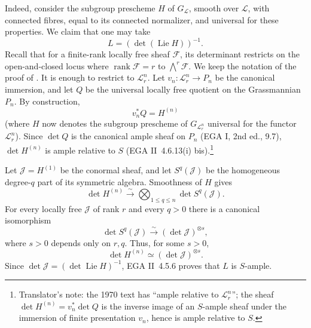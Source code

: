 
Indeed, consider the subgroup prescheme \(H\) of \(G_{\mathcal L}\),
smooth over \(\mathcal L\), with connected fibres, equal to its
connected normalizer, and universal for these properties. We claim
that one may take
\[
  L=(\det(\operatorname{Lie}H))^{-1}.
\]
Recall that for a finite-rank locally free sheaf \(\mathcal F\), its
determinant restricts on the open-and-closed locus where
\(\operatorname{rank}\mathcal F=r\) to \(\bigwedge^r\mathcal F\).
We keep the notation of the proof of .
It is enough to restrict to \(\mathcal L_r^n\). Let
\(v_n:\mathcal L_r^n\to P_n\) be the canonical immersion, and let
\(Q\) be the universal locally free quotient on the Grassmannian
\(P_n\). By construction,
\[
  v_n^*Q=H^{(n)}
\]
(where \(H\) now denotes the subgroup prescheme of \(G_{\mathcal L_r^n}\) universal for the
functor \(\mathcal L_r^n\)).
Since \(\det Q\) is the canonical ample sheaf on \(P_n\) (EGA I,
2nd ed., 9.7), \(\det H^{(n)}\) is ample relative to \(S\)
(EGA II~4.6.13(i) bis).\footnote{Translator's note: the 1970 text has ``ample relative to \(\mathcal L_r^n\)''; the sheaf \(\det H^{(n)}=v_n^*\det Q\) is the inverse image of an \(S\)-ample sheaf under the immersion of finite presentation \(v_n\), hence is ample relative to \(S\).}

Let \(\mathcal J=H^{(1)}\) be the conormal sheaf, and let
\(S^q(\mathcal J)\) be the homogeneous degree-\(q\) part of its
symmetric algebra. Smoothness of \(H\) gives
\[
  \det H^{(n)}
  \xrightarrow{\sim}
  \bigotimes_{1\leq q\leq n}\det S^q(\mathcal J).
\]
For every locally free \(\mathcal J\) of rank \(r\) and every \(q>0\)
there is a canonical isomorphism
\[
  \det S^q(\mathcal J)
  \xrightarrow{\sim}
  (\det\mathcal J)^{\otimes s},
\]
where \(s>0\) depends only on \(r,q\). Thus, for some \(s>0\),
\[
  \det H^{(n)}\simeq(\det\mathcal J)^{\otimes s}.
\]
Since \(\det\mathcal J=(\det\operatorname{Lie}H)^{-1}\), EGA
II~4.5.6 proves that \(L\) is \(S\)-ample.


